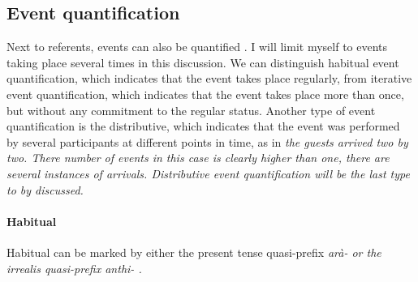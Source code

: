 






\subsection{Event quantification}\label{sec:func:Eventquantification}
Next to referents, events can also be quantified \citep[179f]{HengeveldEtAl2008fdg}. I will limit myself to events taking place several times in this discussion. We can distinguish habitual event quantification, which indicates that the event takes place regularly, from iterative event quantification, which indicates that the event takes place more than once, but without any commitment to the regular status. Another type of event quantification is the distributive, which indicates that the event was performed by several participants at different points in time, as in \em the guests arrived two by two\em. There number of events in this case is clearly higher than one, there are several instances of arrivals. Distributive event quantification will be the last type to by discussed.

\paragraph{Habitual}\label{sec:func:asp:Habitual}
Habitual can be marked by either  the present tense quasi-prefix \em arà- \em \citep{Ansaldo2009book}    or the irrealis quasi-prefix \em anthi- \em {} . 



